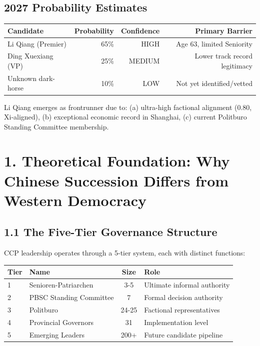 \documentclass[11pt]{article}
\begin{document}
\subsection{2027 Probability Estimates}

\begin{table}[h]
\centering
\begin{tabular}{|l|r|r|r|}
\hline
\textbf{Candidate} & \textbf{Probability} & \textbf{Confidence} & \textbf{Primary Barrier} \\
\hline
Li Qiang (Premier) & 65\% & HIGH & Age 63, limited Seniority \\
Ding Xuexiang (VP) & 25\% & MEDIUM & Lower track record legitimacy \\
Unknown dark-horse & 10\% & LOW & Not yet identified/vetted \\
\hline
\end{tabular}
\end{table}

Li Qiang emerges as frontrunner due to: (a) ultra-high factional alignment (0.80, Xi-aligned), (b) exceptional economic record in Shanghai, (c) current Politburo Standing Committee membership.

\section{1. Theoretical Foundation: Why Chinese Succession Differs from Western Democracy}

\subsection{1.1 The Five-Tier Governance Structure}

CCP leadership operates through a 5-tier system, each with distinct functions:

\begin{table}[h]
\centering
\begin{tabular}{|l|l|c|l|}
\hline
\textbf{Tier} & \textbf{Name} & \textbf{Size} & \textbf{Role} \\
\hline
1 & Senioren-Patriarchen & 3-5 & Ultimate informal authority \\
2 & PBSC Standing Committee & 7 & Formal decision authority \\
3 & Politburo & 24-25 & Factional representatives \\
4 & Provincial Governors & 31 & Implementation level \\
5 & Emerging Leaders & 200+ & Future candidate pipeline \\
\hline
\end{tabular}
\end{table}
\end{document}
